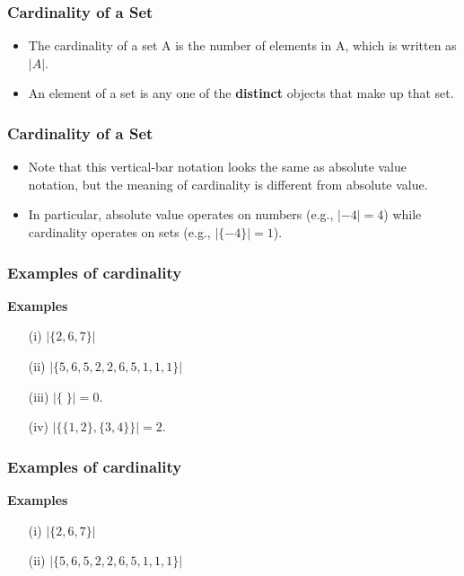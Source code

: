 \documentclass[]{report}
\begin{document}
\begin{frame}
	\frametitle{Cardinality of a Set}
	\Large
	\vspace{-1cm}
	\begin{itemize}
		\item The cardinality of a set A is the number of elements in A, which is written as $|A|$.
		\item An element of a set is any one of the \textbf{distinct} objects that make up that set.
		
	\end{itemize}
\end{frame}
\begin{frame}
	\frametitle{Cardinality of a Set}
	\Large
	\vspace{-1cm}
	\begin{itemize}
		
		\item Note that this vertical-bar notation looks the same as absolute value notation, 
		but the meaning of cardinality is different from absolute value.
		
		\item In particular, absolute value operates on numbers (e.g., $|-4| = 4$) 
		while cardinality operates on sets (e.g., $|\{-4\}| = 1$).
	\end{itemize}
\end{frame}
\begin{frame}
	\frametitle{Examples of cardinality}
	\LARGE
	\vspace{-1cm}
	\textbf{Examples}
	\begin{itemize}
		\item[(i)] $|\{2,6,7\}|$
		\item[(ii)] $|\{5,6,5,2,2,6,5,1,1,1\}|$
		\item[(iii)] $|\{ \;\}| = 0$. %
		\item[(iv)] $|\{\{1,2\},\{3,4\}\}| = 2$. 
	\end{itemize}
\end{frame}

\begin{frame}
	\frametitle{Examples of cardinality}
	\LARGE
	\vspace{-1cm}
	\textbf{Examples}
	\begin{itemize}
		\item[(i)] $|\{2,6,7\}| $
		\vspace{2cm}
		\item[(ii)] $|\{5,6,5,2,2,6,5,1,1,1\}| $
	\end{itemize}
\end{frame}
\end{document}
